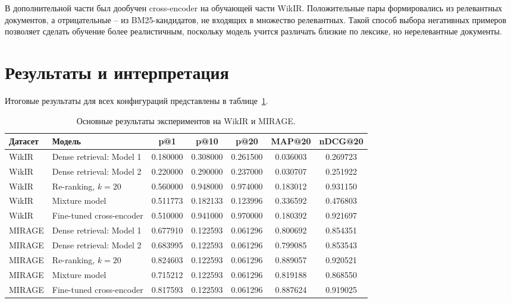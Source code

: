 \documentclass[11pt]{article}
\begin{document}
В дополнительной части был дообучен cross-encoder на обучающей части WikIR. Положительные
пары формировались из релевантных документов, а отрицательные -- из BM25-кандидатов,
не входящих в множество релевантных. Такой способ выбора негативных примеров позволяет
сделать обучение более реалистичным, поскольку модель учится различать близкие по
лексике, но нерелевантные документы.

\section{Результаты и интерпретация}

Итоговые результаты для всех конфигураций представлены в таблице~\ref{tab:main_results}.

\begin{table}[t]
\centering
\begin{tabular}{l l c c c c c}
\hline
Датасет & Модель & p@1 & p@10 & p@20 & MAP@20 & nDCG@20 \\
\hline
WikIR & Dense retrieval: Model 1 & 0.180000 & 0.308000 & 0.261500 & 0.036003 & 0.269723 \\
WikIR & Dense retrieval: Model 2 & 0.220000 & 0.290000 & 0.237000 & 0.030707 & 0.251922 \\
WikIR & Re-ranking, $k=20$       & 0.560000 & 0.948000 & 0.974000 & 0.183012 & 0.931150 \\
WikIR & Mixture model            & 0.511773 & 0.182133 & 0.123996 & 0.336592 & 0.476803 \\
WikIR & Fine-tuned cross-encoder & 0.510000 & 0.941000 & 0.970000 & 0.180392 & 0.921697 \\
\hline
MIRAGE & Dense retrieval: Model 1 & 0.677910 & 0.122593 & 0.061296 & 0.800692 & 0.854351 \\
MIRAGE & Dense retrieval: Model 2 & 0.683995 & 0.122593 & 0.061296 & 0.799085 & 0.853543 \\
MIRAGE & Re-ranking, $k=20$       & 0.824603 & 0.122593 & 0.061296 & 0.889057 & 0.920521 \\
MIRAGE & Mixture model            & 0.715212 & 0.122593 & 0.061296 & 0.819188 & 0.868550 \\
MIRAGE & Fine-tuned cross-encoder & 0.817593 & 0.122593 & 0.061296 & 0.887624 & 0.919025 \\
\hline
\end{tabular}
\caption{Основные результаты экспериментов на WikIR и MIRAGE.}
\label{tab:main_results}
\end{table}
\end{document}
